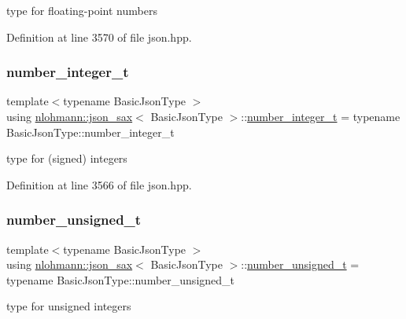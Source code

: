 type for floating-\/point numbers 



Definition at line 3570 of file json.\+hpp.

\mbox{\label{structnlohmann_1_1json__sax_a0cef30121f02b7fee85e9708148ea0aa}} 
\subsubsection{\texorpdfstring{number\+\_\+integer\+\_\+t}{number\_integer\_t}}
{\footnotesize\ttfamily template$<$typename Basic\+Json\+Type $>$ \\
using \hyperlink{structnlohmann_1_1json__sax}{nlohmann\+::json\+\_\+sax}$<$ Basic\+Json\+Type $>$\+::\hyperlink{structnlohmann_1_1json__sax_a0cef30121f02b7fee85e9708148ea0aa}{number\+\_\+integer\+\_\+t} =  typename Basic\+Json\+Type\+::number\+\_\+integer\+\_\+t}



type for (signed) integers 



Definition at line 3566 of file json.\+hpp.

\mbox{\label{structnlohmann_1_1json__sax_a32028cc056ae0f43aaae331cdbbbf856}} 
\subsubsection{\texorpdfstring{number\+\_\+unsigned\+\_\+t}{number\_unsigned\_t}}
{\footnotesize\ttfamily template$<$typename Basic\+Json\+Type $>$ \\
using \hyperlink{structnlohmann_1_1json__sax}{nlohmann\+::json\+\_\+sax}$<$ Basic\+Json\+Type $>$\+::\hyperlink{structnlohmann_1_1json__sax_a32028cc056ae0f43aaae331cdbbbf856}{number\+\_\+unsigned\+\_\+t} =  typename Basic\+Json\+Type\+::number\+\_\+unsigned\+\_\+t}



type for unsigned integers 



